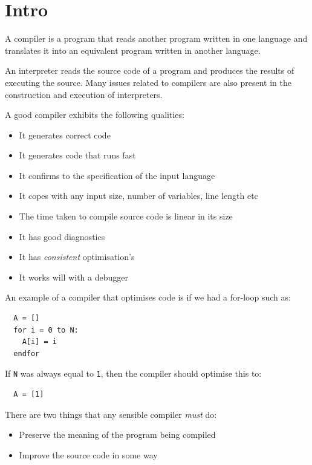 
\section{Intro}

A compiler is a program that reads another program written in one language and
translates it into an equivalent program written in another language.

An interpreter reads the source code of a program and produces the results of
executing the source. Many issues related to compilers are also present in the
construction and execution of interpreters.

A good compiler exhibits the following qualities:

\begin{itemize}
  \item It generates correct code
  \item It generates code that runs fast
  \item It confirms to the specification of the input language
  \item It copes with any input size, number of variables, line length etc
  \item The time taken to compile source code is linear in its size
  \item It has good diagnostics
  \item It has \textit{consistent} optimisation's
  \item It works will with a debugger
\end{itemize}

An example of a compiler that optimises code is if we had a for-loop such as:

\begin{verbatim}
  A = []
  for i = 0 to N:
    A[i] = i
  endfor
\end{verbatim}

If \texttt{N} was always equal to \texttt{1}, then the compiler should optimise
this to:

\begin{verbatim}
  A = [1]
\end{verbatim}

There are two things that any sensible compiler \textit{must} do:

\begin{itemize}
  \item Preserve the meaning of the program being compiled
  \item Improve the source code in some way
\end{itemize}

